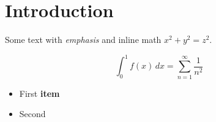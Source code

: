\documentclass[11pt]{article}
\begin{document}
\section{Introduction}
Some text with \emph{emphasis} and inline math $x^2 + y^2 = z^2$.

\begin{equation}
  \int_0^1 f(x)\,dx = \sum_{n=1}^{\infty} \frac{1}{n^2}
\end{equation}

\begin{itemize}
  \item First \textbf{item}
  \item Second \cite{knuth84}
\end{itemize}
\end{document}
